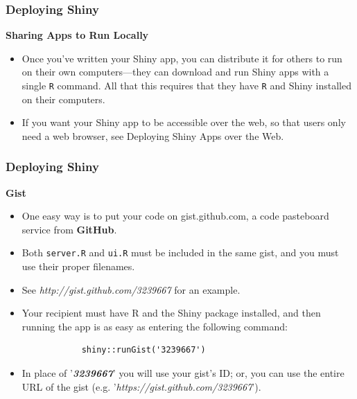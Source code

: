 \documentclass{beamer}
\begin{document}
\begin{frame}
	\frametitle{Deploying Shiny}
	\Large
	\textbf{Sharing Apps to Run Locally}
	\begin{itemize}
		\item Once you’ve written your Shiny app, you can distribute it for others to run on their own computers—they can download and run Shiny apps with a single \texttt{R} command. All that this requires that they have \texttt{R} and Shiny installed on their computers.
		
		\item If you want your Shiny app to be accessible over the web, so that users only need a web browser, see Deploying Shiny Apps over the Web.
	\end{itemize}
	
\end{frame}
\begin{frame}
	\frametitle{Deploying Shiny}
	\Large
	\textbf{Gist}
	\begin{itemize}
		\item One easy way is to put your code on gist.github.com, a code pasteboard service from \textbf{GitHub}. 
		\item Both \texttt{server.R} and \texttt{ui.R} must be included in the same gist, and you must use their proper filenames. 
		\item See \textit{http://gist.github.com/3239667} for an example.
	\end{itemize}
\end{frame}
\begin{frame}[fragile]
	\Large
	\begin{itemize}
		\item Your recipient must have R and the Shiny package installed, and then running the app is as easy as entering the following command:
		
		\begin{framed}
			\begin{verbatim}
			shiny::runGist('3239667')
			\end{verbatim}
		\end{framed}
		\item In place of '\textit{\textbf{3239667}}' you will use your gist’s ID; or, you can use the entire URL of the gist (e.g. '\textit{https://gist.github.com/3239667}').
	\end{itemize}
\end{frame}
\end{document}
